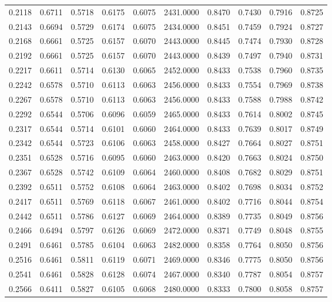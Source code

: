 \begin{tabular}{rrrrrrrrrr}
0.2118 & 0.6711 & 0.5718 & 0.6175 & 0.6075 & 2431.0000 & 0.8470 & 0.7430 & 0.7916 & 0.8725 \\
0.2143 & 0.6694 & 0.5729 & 0.6174 & 0.6075 & 2434.0000 & 0.8451 & 0.7459 & 0.7924 & 0.8727 \\
0.2168 & 0.6661 & 0.5725 & 0.6157 & 0.6070 & 2443.0000 & 0.8445 & 0.7474 & 0.7930 & 0.8728 \\
0.2192 & 0.6661 & 0.5725 & 0.6157 & 0.6070 & 2443.0000 & 0.8439 & 0.7497 & 0.7940 & 0.8731 \\
0.2217 & 0.6611 & 0.5714 & 0.6130 & 0.6065 & 2452.0000 & 0.8433 & 0.7538 & 0.7960 & 0.8735 \\
0.2242 & 0.6578 & 0.5710 & 0.6113 & 0.6063 & 2456.0000 & 0.8433 & 0.7554 & 0.7969 & 0.8738 \\
0.2267 & 0.6578 & 0.5710 & 0.6113 & 0.6063 & 2456.0000 & 0.8433 & 0.7588 & 0.7988 & 0.8742 \\
0.2292 & 0.6544 & 0.5706 & 0.6096 & 0.6059 & 2465.0000 & 0.8433 & 0.7614 & 0.8002 & 0.8745 \\
0.2317 & 0.6544 & 0.5714 & 0.6101 & 0.6060 & 2464.0000 & 0.8433 & 0.7639 & 0.8017 & 0.8749 \\
0.2342 & 0.6544 & 0.5723 & 0.6106 & 0.6063 & 2458.0000 & 0.8427 & 0.7664 & 0.8027 & 0.8751 \\
0.2351 & 0.6528 & 0.5716 & 0.6095 & 0.6060 & 2463.0000 & 0.8420 & 0.7663 & 0.8024 & 0.8750 \\
0.2367 & 0.6528 & 0.5742 & 0.6109 & 0.6064 & 2460.0000 & 0.8408 & 0.7682 & 0.8029 & 0.8751 \\
0.2392 & 0.6511 & 0.5752 & 0.6108 & 0.6064 & 2463.0000 & 0.8402 & 0.7698 & 0.8034 & 0.8752 \\
0.2417 & 0.6511 & 0.5769 & 0.6118 & 0.6067 & 2461.0000 & 0.8402 & 0.7716 & 0.8044 & 0.8754 \\
0.2442 & 0.6511 & 0.5786 & 0.6127 & 0.6069 & 2464.0000 & 0.8389 & 0.7735 & 0.8049 & 0.8756 \\
0.2466 & 0.6494 & 0.5797 & 0.6126 & 0.6069 & 2472.0000 & 0.8371 & 0.7749 & 0.8048 & 0.8755 \\
0.2491 & 0.6461 & 0.5785 & 0.6104 & 0.6063 & 2482.0000 & 0.8358 & 0.7764 & 0.8050 & 0.8756 \\
0.2516 & 0.6461 & 0.5811 & 0.6119 & 0.6071 & 2469.0000 & 0.8346 & 0.7775 & 0.8050 & 0.8756 \\
0.2541 & 0.6461 & 0.5828 & 0.6128 & 0.6074 & 2467.0000 & 0.8340 & 0.7787 & 0.8054 & 0.8757 \\
0.2566 & 0.6411 & 0.5827 & 0.6105 & 0.6068 & 2480.0000 & 0.8333 & 0.7800 & 0.8058 & 0.8757 \\

\end{tabular}
